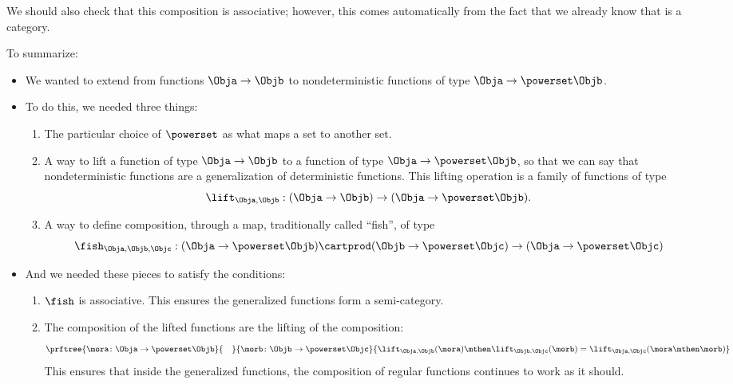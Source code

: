 We should also check that this composition is associative; however, this comes automatically from the fact that we already know that \Rel is a category.

To summarize:
\begin{itemize}
    \item We wanted to extend \Set from functions $\Obja \to \Objb$ to nondeterministic functions of type $\Obja \to \powerset\Objb$.
    \item To do this, we needed three things:
          \begin{enumerate}
              \item The particular choice of $\powerset$ as what maps a set to another set.
              \item A way to lift a function of type $\Obja \to \Objb$ to a function of type $\Obja \to \powerset\Objb$, so that we can say that nondeterministic functions are a generalization of deterministic functions.
                    This lifting operation is a family of functions of type
                    \begin{equation}
                        \label{eq:monad-lift}
                        \lift_{\Obja, \Objb}: (\Obja \to \Objb) \to (\Obja \to \powerset\Objb).
                    \end{equation}
              \item A way to define composition, through a map, traditionally called ``fish'', of type
                    \begin{equation}
                        \label{eq:monad-fish}
                        \fish_{\Obja, \Objb, \Objc}: (\Obja \to \powerset\Objb) \cartprod (\Objb \to \powerset\Objc)
                        \to (\Obja \to \powerset \Objc)
                    \end{equation}
          \end{enumerate}
    \item And we needed these pieces to satisfy the conditions:
          \begin{enumerate}
              \item $\fish$ is associative.
                    This ensures the generalized functions form a semi-category.
              \item The composition of the lifted functions are the lifting of the composition:
                    \begin{equation}
                        \label{eq:monad-fish-associative}
                        \prftree{\mora\colon \Obja \to \powerset\Objb}{\quad}{\morb\colon \Objb \to \powerset \Objc}{
                            \lift_{\Obja,\Objb}(\mora)\mthen\lift_{\Objb,\Objc}(\morb) =  \lift_{\Obja,\Objc}(\mora\mthen\morb)}
                    \end{equation}
                    This ensures that inside the generalized functions, the composition of regular functions continues to work as it should.
          \end{enumerate}
\end{itemize}

